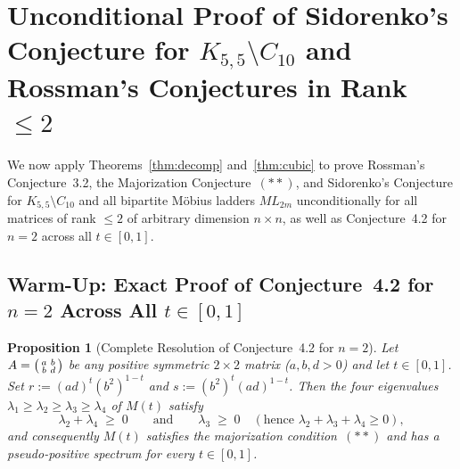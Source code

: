 \documentclass[11pt,a4paper]{article}
\theoremstyle{plain}
\newtheorem{proposition}[theorem]{Proposition}
\theoremstyle{definition}
\theoremstyle{remark}
\begin{document}
\section{Unconditional Proof of Sidorenko's Conjecture for \texorpdfstring{$K_{5,5} \setminus C_{10}$}{K55 - C10} and Rossman's Conjectures in Rank \texorpdfstring{$\le 2$}{<= 2}}\label{sec:rank2}

We now apply Theorems~\ref{thm:decomp} and~\ref{thm:cubic} to prove Rossman's Conjecture~3.2, the Majorization Conjecture~$(**)$, and Sidorenko's Conjecture for $K_{5,5} \setminus C_{10}$ and all bipartite M\"obius ladders $ML_{2m}$ unconditionally for all matrices of rank $\le 2$ of arbitrary dimension $n \times n$, as well as Conjecture~4.2 for $n = 2$ across all $t \in [0,1]$.

\subsection{Warm-Up: Exact Proof of Conjecture~4.2 for \texorpdfstring{$n = 2$}{n = 2} Across All \texorpdfstring{$t \in [0,1]$}{t in [0,1]}}

\begin{proposition}[Complete Resolution of Conjecture~4.2 for $n = 2$]\label{prop:n2}
Let $A = \begin{psmallmatrix} a & b \\ b & d \end{psmallmatrix}$ be any positive symmetric $2 \times 2$ matrix ($a, b, d > 0$) and let $t \in [0,1]$. Set $r := (ad)^t(b^2)^{1-t}$ and $s := (b^2)^t(ad)^{1-t}$. Then the four eigenvalues $\lambda_1 \ge \lambda_2 \ge \lambda_3 \ge \lambda_4$ of $M(t)$ satisfy
\[
  \lambda_2 + \lambda_4 \;\ge\; 0 \qquad \text{and} \qquad \lambda_3 \;\ge\; 0 \quad (\text{hence } \lambda_2 + \lambda_3 + \lambda_4 \ge 0),
\]
and consequently $M(t)$ satisfies the majorization condition~$(**)$ and has a pseudo-positive spectrum for every $t \in [0,1]$.
\end{proposition}
\end{document}
